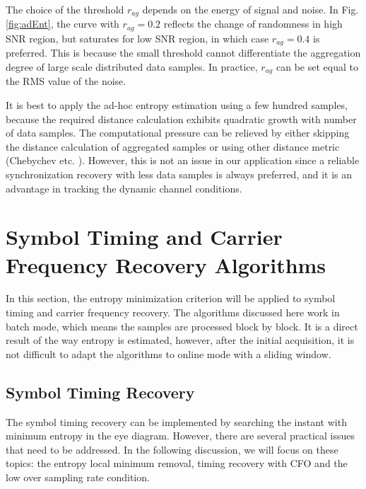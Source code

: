 \documentclass[journal,comsoc]{IEEEtran}
\begin{document}
The choice of the threshold \(r_{ag}\) depends on the energy of signal and noise.
In Fig. \ref{fig:adEnt}, the curve with \(r_{ag}=0.2\) reflects the change of randomness in high SNR region, but saturates for low SNR region, in which case \(r_{ag}=0.4\) is preferred.
This is because the small threshold cannot differentiate the aggregation degree of large scale distributed data samples.
In practice, $r_{ag}$ can be set equal to the RMS value of the noise.

It is best to apply the ad-hoc entropy estimation using a few hundred samples,
because the required distance calculation exhibits quadratic growth with number of data samples. 
The computational pressure can be relieved by either skipping the distance calculation of aggregated samples or using other distance metric (Chebychev etc. \cite{Cha2007}).
However, this is not an issue in our application since a reliable synchronization  recovery with less data samples is always preferred, and it is an advantage in tracking the dynamic channel conditions. 
\section{Symbol Timing and Carrier Frequency Recovery Algorithms}
\label{sec:sync_algo}
In this section, the entropy minimization criterion will be applied to symbol timing and carrier frequency recovery.
The algorithms discussed here work in batch mode, which means the samples are processed block by block. 
It is a direct result of the way entropy is estimated, however, after the initial acquisition, it is not difficult to adapt the algorithms to online mode with a sliding window.





\subsection{Symbol Timing Recovery} 
\label{sec:timing}
The symbol timing recovery can be implemented by searching the instant with minimum entropy in the eye diagram.
However, there are several practical issues that need to be addressed.
In the following discussion, we will focus on these topics: the entropy local minimum removal, timing recovery with CFO and the low over sampling rate condition.
\end{document}
